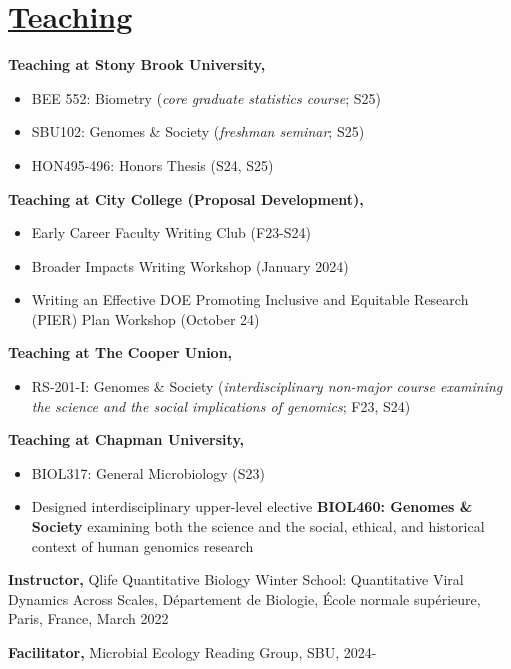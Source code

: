 \documentclass[]{res}
\begin{document}
\begin{resume}
\begin{enumerate}[leftmargin=*]
  \end{enumerate} 


\section{\underline{Teaching}} \vspace{2mm}

{\bf Teaching at Stony Brook University,} 
\begin{itemize} \itemsep -2pt
\item BEE 552: Biometry (\emph{core graduate statistics course}; S25)
\item SBU102: Genomes \& Society (\emph{freshman seminar}; S25)
\item HON495-496: Honors Thesis (S24, S25)
\end{itemize}

{\bf Teaching at City College (Proposal Development),} 
\begin{itemize} \itemsep -2pt
\item Early Career Faculty Writing Club (F23-S24)
\item Broader Impacts Writing Workshop (January 2024)
\item Writing an Effective DOE Promoting Inclusive and Equitable Research (PIER) Plan Workshop (October 24)
\end{itemize}


{\bf Teaching at The Cooper Union,} 
\begin{itemize} \itemsep -2pt
\item RS-201-I: Genomes \& Society (\emph{interdisciplinary non-major course examining the science and the social implications of genomics}; F23, S24)
\end{itemize}

{\bf Teaching at Chapman University,} 
\begin{itemize} \itemsep -2pt
\item BIOL317: General Microbiology (S23)
\item Designed interdisciplinary upper-level elective {\bf BIOL460: Genomes \& Society} examining both the science and the social, ethical, and historical context of human genomics research
\end{itemize}

{\bf Instructor,} Qlife Quantitative Biology Winter School: Quantitative Viral Dynamics Across Scales, D\'{e}partement de Biologie, \'{E}cole normale sup\'{e}rieure, Paris, France, March 2022

{\bf Facilitator,} {Microbial Ecology Reading Group}, SBU, 2024-


\end{resume}
\end{document}
